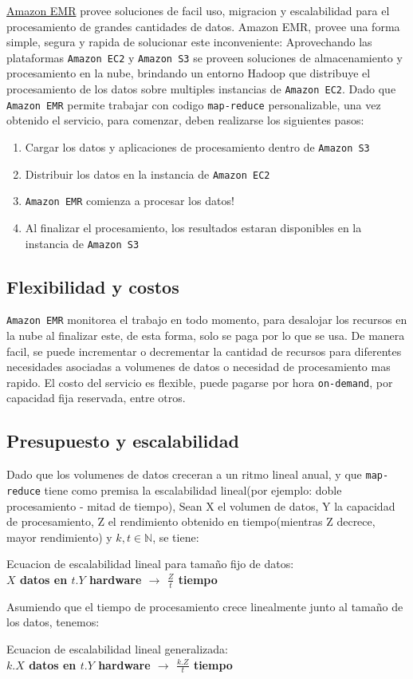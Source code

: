 \documentclass{article}
\begin{document}
\href{http://aws.amazon.com/es/elasticmapreduce/}{Amazon EMR} provee soluciones de facil uso, migracion y escalabilidad para el procesamiento de grandes cantidades de 
datos.
Amazon EMR, provee una forma simple, segura y rapida de solucionar este inconveniente: Aprovechando las plataformas \verb|Amazon EC2| y \verb|Amazon S3| se proveen soluciones de almacenamiento y procesamiento en la nube, brindando un entorno Hadoop que distribuye el procesamiento de los datos sobre multiples instancias de \verb|Amazon EC2|. Dado que \verb|Amazon EMR| permite trabajar con codigo \verb|map-reduce| personalizable, una vez obtenido el servicio, para comenzar, deben realizarse los siguientes pasos:
\begin{enumerate}
  \item Cargar los datos y aplicaciones de procesamiento dentro de \verb|Amazon S3|
  \item Distribuir los datos en la instancia de \verb|Amazon EC2|
  \item \verb|Amazon EMR| comienza a procesar los datos!
  \item Al finalizar el procesamiento, los resultados estaran disponibles en la instancia de \verb|Amazon S3|
\end{enumerate}

\subsection{Flexibilidad y costos}
\verb|Amazon EMR| monitorea el trabajo en todo momento, para desalojar los recursos en la nube al finalizar este, de esta forma, solo se paga por lo que se usa.
De manera facil, se puede incrementar o decrementar la cantidad de recursos para diferentes necesidades asociadas a volumenes de datos o necesidad de procesamiento mas rapido. El costo del servicio es flexible, puede pagarse por hora \verb|on-demand|, por capacidad fija reservada, entre otros. 

\subsection{Presupuesto y escalabilidad}
Dado que los volumenes de datos creceran a un ritmo lineal anual, y que \verb|map-reduce| tiene como premisa la escalabilidad lineal(por ejemplo: doble procesamiento - mitad de tiempo), Sean X el volumen de datos, Y la capacidad de procesamiento, Z el rendimiento obtenido en tiempo(mientras Z decrece, mayor rendimiento) y $k,t \in \mathbb{N}$, se tiene:
\newpage
\begin{center}
    Ecuacion de escalabilidad lineal para tama\~no fijo de datos: \\
    \textbf{$X$ datos en $t.Y$ hardware $\rightarrow$ $\frac{Z}{t}$ tiempo}
\end{center}
Asumiendo que el tiempo de procesamiento crece linealmente junto al tamaño de los datos, tenemos:\\
\begin{center}
    Ecuacion de escalabilidad lineal generalizada:\\
    \textbf{$k.X$ datos en $t.Y$ hardware $\rightarrow$ $\frac{k.Z}{t}$ tiempo}
\end{center}
\end{document}
